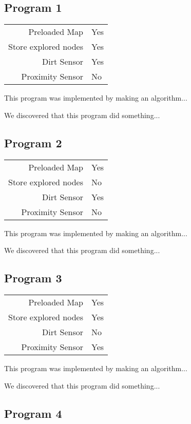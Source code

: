 \documentclass[letterpaper]{article}
\begin{document}
\subsection{Program 1}

\begin{tabular}{ r | l }  
	Preloaded Map			& Yes \\
	Store explored nodes	& Yes \\
	Dirt Sensor				& Yes \\
	Proximity Sensor		& No \\
\end{tabular}

This program was implemented by making an algorithm...

We discovered that this program did something...


\subsection{Program 2}

\begin{tabular}{ r | l }  
	Preloaded Map			& Yes \\
	Store explored nodes	& No \\
	Dirt Sensor				& Yes \\
	Proximity Sensor		& No \\
\end{tabular}

This program was implemented by making an algorithm...

We discovered that this program did something...


\subsection{Program 3}

\begin{tabular}{ r | l }  
	Preloaded Map			& Yes \\
	Store explored nodes	& Yes \\
	Dirt Sensor				& No \\
	Proximity Sensor		& Yes \\
\end{tabular}

This program was implemented by making an algorithm...

We discovered that this program did something...


\subsection{Program 4}
\end{document}
